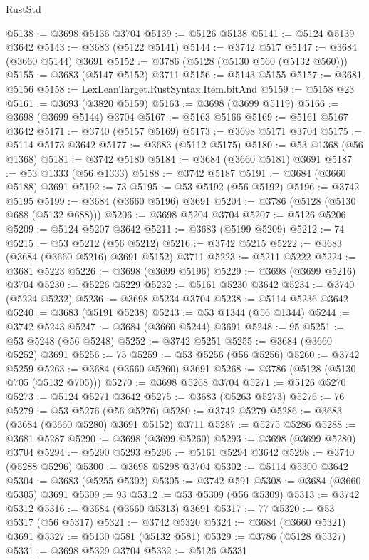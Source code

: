 \begin{lexlean}{RustStd}
\begin{coremodule}
{\begin{coremodule}
{{{{{{{{{{{{{{{{{{{{{{{{{{{{{{{{{{{{{{{{{{{{{{{@5138 := @3698 @5136 @3704
@5139 := @5126 @5138
@5141 := @5124 @5139 @3642
@5143 := @3683 (@5122 @5141)
@5144 := @3742 @517
@5147 := @3684 (@3660 @5144) @3691
@5152 := @3786 (@5128 (@5130 @560 (@5132 @560)))
@5155 := @3683 (@5147 @5152) @3711
@5156 := @5143 @5155
@5157 := @3681 @5156
@5158 := LexLeanTarget.RustSyntax.Item.bitAnd
@5159 := @5158 @23
@5161 := @3693 (@3820 @5159)
@5163 := @3698 (@3699 @5119)
@5166 := @3698 (@3699 @5144) @3704
@5167 := @5163 @5166
@5169 := @5161 @5167 @3642
@5171 := @3740 (@5157 @5169)
@5173 := @3698 @5171 @3704
@5175 := @5114 @5173 @3642
@5177 := @3683 (@5112 @5175)
@5180 := @53 @1368 (@56 @1368)
@5181 := @3742 @5180
@5184 := @3684 (@3660 @5181) @3691
@5187 := @53 @1333 (@56 @1333)
@5188 := @3742 @5187
@5191 := @3684 (@3660 @5188) @3691
@5192 := 73
@5195 := @53 @5192 (@56 @5192)
@5196 := @3742 @5195
@5199 := @3684 (@3660 @5196) @3691
@5204 := @3786 (@5128 (@5130 @688 (@5132 @688)))
@5206 := @3698 @5204 @3704
@5207 := @5126 @5206
@5209 := @5124 @5207 @3642
@5211 := @3683 (@5199 @5209)
@5212 := 74
@5215 := @53 @5212 (@56 @5212)
@5216 := @3742 @5215
@5222 := @3683 (@3684 (@3660 @5216) @3691 @5152) @3711
@5223 := @5211 @5222
@5224 := @3681 @5223
@5226 := @3698 (@3699 @5196)
@5229 := @3698 (@3699 @5216) @3704
@5230 := @5226 @5229
@5232 := @5161 @5230 @3642
@5234 := @3740 (@5224 @5232)
@5236 := @3698 @5234 @3704
@5238 := @5114 @5236 @3642
@5240 := @3683 (@5191 @5238)
@5243 := @53 @1344 (@56 @1344)
@5244 := @3742 @5243
@5247 := @3684 (@3660 @5244) @3691
@5248 := 95
@5251 := @53 @5248 (@56 @5248)
@5252 := @3742 @5251
@5255 := @3684 (@3660 @5252) @3691
@5256 := 75
@5259 := @53 @5256 (@56 @5256)
@5260 := @3742 @5259
@5263 := @3684 (@3660 @5260) @3691
@5268 := @3786 (@5128 (@5130 @705 (@5132 @705)))
@5270 := @3698 @5268 @3704
@5271 := @5126 @5270
@5273 := @5124 @5271 @3642
@5275 := @3683 (@5263 @5273)
@5276 := 76
@5279 := @53 @5276 (@56 @5276)
@5280 := @3742 @5279
@5286 := @3683 (@3684 (@3660 @5280) @3691 @5152) @3711
@5287 := @5275 @5286
@5288 := @3681 @5287
@5290 := @3698 (@3699 @5260)
@5293 := @3698 (@3699 @5280) @3704
@5294 := @5290 @5293
@5296 := @5161 @5294 @3642
@5298 := @3740 (@5288 @5296)
@5300 := @3698 @5298 @3704
@5302 := @5114 @5300 @3642
@5304 := @3683 (@5255 @5302)
@5305 := @3742 @591
@5308 := @3684 (@3660 @5305) @3691
@5309 := 93
@5312 := @53 @5309 (@56 @5309)
@5313 := @3742 @5312
@5316 := @3684 (@3660 @5313) @3691
@5317 := 77
@5320 := @53 @5317 (@56 @5317)
@5321 := @3742 @5320
@5324 := @3684 (@3660 @5321) @3691
@5327 := @5130 @581 (@5132 @581)
@5329 := @3786 (@5128 @5327)
@5331 := @3698 @5329 @3704
@5332 := @5126 @5331
}}}}}}}}}}}}}}}}}}}}}}}}}}}}}}}}}}}}}}}}}}}}}}}
\end{coremodule}}
\end{coremodule}
\end{lexlean}
